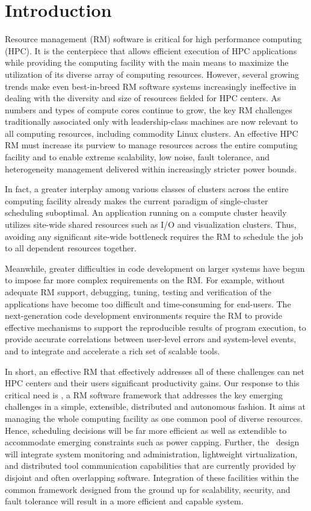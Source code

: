 \section{Introduction}

Resource management (RM) software is critical
for high performance computing (HPC).
It is the centerpiece that allows efficient
execution of HPC applications while providing
the computing facility with the main means
to maximize the utilization of its diverse array of computing
resources.
However, several growing trends make even
best-in-breed RM software systems increasingly ineffective
in dealing with the diversity and size of resources fielded for HPC centers.
As numbers and types of compute cores
continue to grow, the key RM challenges traditionally associated only
with leadership-class machines are now
relevant to all computing resources, including
commodity Linux clusters. An effective HPC RM must increase
its purview to manage resources across the entire
computing facility and to enable extreme scalability,
low noise, fault tolerance,
and heterogeneity management delivered within increasingly
stricter power bounds.

In fact, a greater interplay among various classes
of clusters across the entire computing facility already 
makes the current paradigm of single-cluster scheduling
suboptimal. An application running on a compute
cluster heavily utilizes site-wide shared resources
such as I/O and visualization clusters.
Thus, avoiding any significant site-wide bottleneck
requires the RM to schedule the job to all dependent
resources together.

Meanwhile, greater difficulties in code development
on larger systems have begun to impose far more complex
requirements on the RM. For example, without adequate
RM support, debugging, tuning, testing and verification
of the applications have become too difficult
and time-consuming for end-users.
The next-generation code development environments
require the RM to provide effective mechanisms
to support the reproducible results of program execution,
to provide accurate correlations between user-level errors
and system-level events,
and to integrate and accelerate a rich set of scalable tools.

In short, an effective RM that effectively
addresses all of these challenges can net HPC centers
and their users significant productivity gains.
Our response to this critical need is \flux,
a RM software framework that addresses the key emerging
challenges in a simple, extensible, distributed
and autonomous fashion.
It aims at managing the whole computing facility
as one common pool of diverse resources.
Hence, scheduling decisions will be far more efficient
as well as extendible to accommodate emerging constraints
such as power capping.
Further, the \flux\ design will integrate system monitoring and
administration, lightweight virtualization, 
and distributed tool communication capabilities 
that are currently provided by disjoint
and often overlapping software. 
Integration of these facilities within the common framework
designed from the ground up for scalability, security,
and fault tolerance will result in a more efficient
and capable system.

